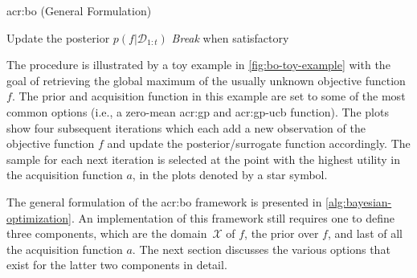 
\begin{algorithm}[!t]
	\caption{\acrlong{acr:bo} (General Formulation) \label{alg:bayesian-optimization}}
	\begin{algorithmic}[1]
		 
			 
			\State Update the posterior $p(f \vert \mathcal{D}_{1:t})$
			\State \textit{Break} when satisfactory 
		\EndFor
		\State {}
	\end{algorithmic}
\end{algorithm}

The procedure is illustrated by a toy example in \autoref{fig:bo-toy-example}  with the goal of retrieving the global maximum of the usually unknown objective function $f$.
The prior and acquisition function in this example are set to some of the most common options (i.e., a zero-mean \acrlong{acr:gp} and \acrshort{acr:gp-ucb} function).
The plots show four subsequent iterations which each add a new observation of the objective function $f$ and update the posterior/surrogate function accordingly.
The sample for each next iteration is selected at the point with the highest utility in the acquisition function $a$, in the plots denoted by a star symbol.

The general formulation of the \acrshort{acr:bo} framework is presented in \autoref{alg:bayesian-optimization}.
An implementation of this framework still requires one to define three components, which are the domain~$\mathcal{X}$ of $f$, the prior over $f$, and last of all the acquisition function $a$.
The next section discusses the various options that exist for the latter two components in detail.

\newpage

